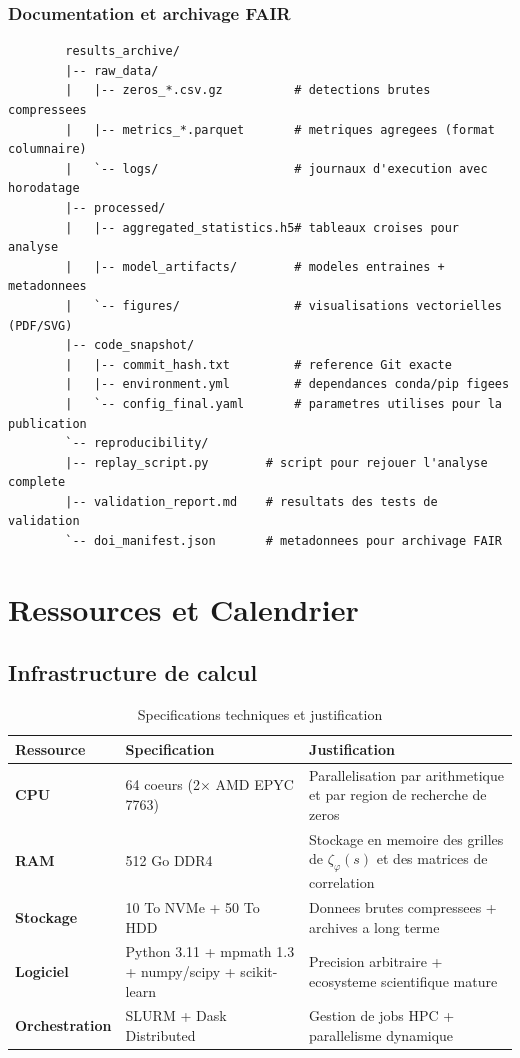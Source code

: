\documentclass[11pt,a4paper]{article}
\begin{document}
	\subsubsection{Documentation et archivage FAIR}
	\begin{verbatim}
		results_archive/
		|-- raw_data/
		|   |-- zeros_*.csv.gz          # detections brutes compressees
		|   |-- metrics_*.parquet       # metriques agregees (format columnaire)
		|   `-- logs/                   # journaux d'execution avec horodatage
		|-- processed/
		|   |-- aggregated_statistics.h5# tableaux croises pour analyse
		|   |-- model_artifacts/        # modeles entraines + metadonnees
		|   `-- figures/                # visualisations vectorielles (PDF/SVG)
		|-- code_snapshot/
		|   |-- commit_hash.txt         # reference Git exacte
		|   |-- environment.yml         # dependances conda/pip figees
		|   `-- config_final.yaml       # parametres utilises pour la publication
		`-- reproducibility/
		|-- replay_script.py        # script pour rejouer l'analyse complete
		|-- validation_report.md    # resultats des tests de validation
		`-- doi_manifest.json       # metadonnees pour archivage FAIR
	\end{verbatim}
	
	\section{Ressources et Calendrier}
	\label{sec:ressources}
	
	\subsection{Infrastructure de calcul}
	\begin{table}[ht]
		\centering
		\caption{Specifications techniques et justification}
		\label{tab:infrastructure}
		\begin{tabular}{p{3cm}p{5cm}p{6cm}}
			\toprule
			\textbf{Ressource} & \textbf{Specification} & \textbf{Justification} \\
			\midrule
			\textbf{CPU} & 64 coeurs (2$\times$ AMD EPYC 7763) & Parallelisation par arithmetique et par region de recherche de zeros \\
			\textbf{RAM} & 512 Go DDR4 & Stockage en memoire des grilles de $\zeta_\varphi(s)$ et des matrices de correlation \\
			\textbf{Stockage} & 10 To NVMe + 50 To HDD & Donnees brutes compressees + archives a long terme \\
			\textbf{Logiciel} & Python 3.11 + mpmath 1.3 + numpy/scipy + scikit-learn & Precision arbitraire + ecosysteme scientifique mature \\
			\textbf{Orchestration} & SLURM + Dask Distributed & Gestion de jobs HPC + parallelisme dynamique \\
			\bottomrule
		\end{tabular}
	\end{table}
	
\end{document}
